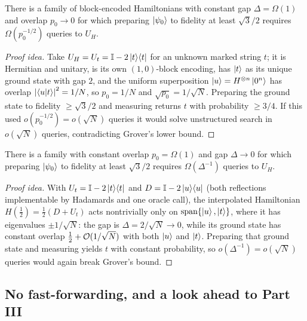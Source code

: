 \begin{theorem}
\label{thm:lec05-lbp0}
There is a family of block-encoded Hamiltonians with constant gap
$\Delta=\Omega(1)$ and overlap $p_0\to0$ for which preparing $\ket{\psi_0}$ to
fidelity at least $\sqrt3/2$ requires $\Omega(p_0^{-1/2})$ queries to $U_H$.
\end{theorem}

\begin{proof}[Proof idea]
Take $U_H=U_t=\mathbb{I}-2\ket{t}\!\bra{t}$ for an unknown marked string $t$; it is Hermitian and
unitary, is its own $(1,0)$-block encoding, has $\ket{t}$ as its unique ground
state with gap $2$, and the uniform superposition $\ket{u}=H^{\otimes n}\ket{0^n}$
has overlap $\left\lvert \braket{u|t} \right\rvert^2=1/N$, so $p_0=1/N$ and $\sqrt{p_0}=1/\sqrt N$.
Preparing the ground state to fidelity $\ge\sqrt3/2$ and measuring returns $t$ with
probability $\ge3/4$. If this used $o(p_0^{-1/2})=o(\sqrt N)$ queries it would
solve unstructured search in $o(\sqrt N)$ queries, contradicting Grover's lower
bound.
\end{proof}

\begin{theorem}
\label{thm:lec05-lbgap}
There is a family with constant overlap $p_0=\Omega(1)$ and gap $\Delta\to0$ for
which preparing $\ket{\psi_0}$ to fidelity at least $\sqrt3/2$ requires
$\Omega(\Delta^{-1})$ queries to $U_H$.
\end{theorem}

\begin{proof}[Proof idea]
With $U_t=\mathbb{I}-2\ket{t}\!\bra{t}$ and $D=\mathbb{I}-2\ket{u}\!\bra{u}$ (both reflections implementable by
Hadamards and one oracle call), the interpolated Hamiltonian
$H(\tfrac12)=\tfrac12(D+U_t)$ acts nontrivially only on
$\operatorname{span}\{\ket{u},\ket{t}\}$, where it has eigenvalues
$\pm1/\sqrt N$: the gap is $\Delta=2/\sqrt N\to0$, while its ground state has
constant overlap $\tfrac12+\mathcal{O}(1/\sqrt N)$ with both $\ket{u}$ and $\ket{t}$.
Preparing that ground state and measuring yields $t$ with constant probability, so
$o(\Delta^{-1})=o(\sqrt N)$ queries would again break Grover's bound.
\end{proof}

\subsection*{No fast-forwarding, and a look ahead to Part III}

